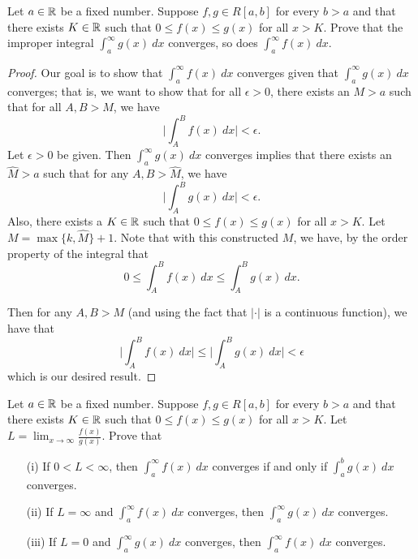 \documentclass[a4paper]{article}
\begin{document}
\begin{problem}
    Let \( a \in \mathbb{R}  \) be a fixed number. Suppose \( f,g \in R[a,b] \) for every \(  b > a  \) and that there exists \( K \in \mathbb{R}  \) such that \( 0 \leq f(x) \leq g(x) \) for all \( x > K  \). Prove that the improper integral \( \int_{ a }^{ \infty  } g(x) \ dx   \) converges, so does \( \int_{ a }^{ \infty  } f(x) \ dx  \). 
\end{problem}
\begin{proof}
    Our goal is to show that \( \int_{ a }^{ \infty  } f(x) \ dx \) converges given that \( \int_{ a }^{ \infty  } g(x) \ dx   \) converges; that is, we want to show that for all \( \epsilon > 0  \), there exists an \( M > a  \) such that for all \( A,B > M  \), we have \[  \Big| \int_{ A }^{ B } f(x) \ dx  \Big| < \epsilon. \]
    Let \( \epsilon > 0  \) be given. Then \( \int_{ a }^{ \infty  } g(x) \ dx   \) converges implies that there exists an \( \hat{M} > a  \) such that for any \( A,B  > \hat{M} \), we have 
    \[  \Big| \int_{ A }^{ B } g(x) \ dx   \Big|  < \epsilon. \]
    Also, there exists a \( K \in \mathbb{R}  \) such that \( 0 \leq f(x) \leq g(x) \) for all \( x > K  \). Let \( M = \max \{ k , \hat{M} \}  + 1  \). Note that with this constructed \( M  \), we have, by the order property of the integral that
    \[  0 \leq \int_{ A }^{ B } f(x) \ dx \leq \int_{ A }^{ B } g(x) \ dx. \]

    Then for any \( A,B > M  \) (and using the fact that \( | \cdot |  \) is a continuous function), we have that 
    \[  \Big| \int_{ A }^{ B } f(x) \ dx   \Big|  \leq \Big| \int_{ A }^{ B } g(x) \ dx \Big|  < \epsilon \]
    which is our desired result.
\end{proof}

\begin{problem}
    Let \( a \in \mathbb{R}  \) be a fixed number. Suppose \( f,g \in R [a,b] \) for every \( b > a  \) and that there exists \( K \in \mathbb{R}  \) such that \( 0 \leq f(x) \leq g(x) \) for all \( x > K  \). Let \( L = \lim_{ x \to \infty  } \frac{ f(x) }{ g(x) }  \). Prove that  
    \begin{enumerate}
        \item[(i)] If \( 0 < L < \infty  \), then \( \int_{ a }^{ \infty  } f(x) \ dx   \) converges if and only if \( \int_{ a }^{ b } g(x) \ dx  \) converges.
        \item[(ii)] If \( L = \infty   \) and \( \int_{ a }^{ \infty  }  f(x)  \ dx  \) converges, then \( \int_{ a }^{ \infty  } g(x) \ dx   \) converges.
        \item[(iii)] If \( L = 0  \) and \( \int_{ a }^{ \infty  }  g(x) \ dx  \) converges, then \( \int_{ a }^{ \infty  } f(x) \ dx   \) converges.
    \end{enumerate}
\end{problem}
\end{document}
